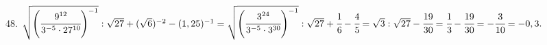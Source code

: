 48. $\sqrt{\left(\cfrac{9^{12}}{3^{-5}\cdot27^{10}}\right)^{-1}}:\sqrt{27}+(\sqrt{6})^{-2}-(1,25)^{-1}=
\sqrt{\left(\cfrac{3^{24}}{3^{-5}\cdot3^{30}}\right)^{-1}}:\sqrt{27}+\cfrac{1}{6}-\cfrac{4}{5}=
\sqrt{3}:\sqrt{27}-\cfrac{19}{30}=\cfrac{1}{3}-\cfrac{19}{30}=-\cfrac{3}{10}=-0,3.$\\
